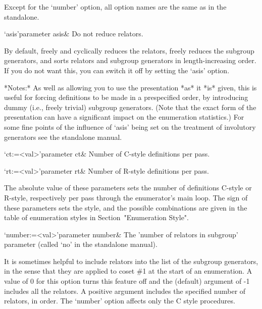 Except for  the `number' option, all  option names are the  same as in
the {\ACE} standalone.



\beginitems
\>`asis'{parameter asis}&
Do not reduce relators.
\enditems

By default, {\ACE} freely  and cyclically reduces the relators, freely
reduces  the  subgroup generators,  and  sorts  relators and  subgroup
generators in length-increasing  order.  If you do not  want this, you
can switch it off by setting the `asis' option.

*Notes:* As well as allowing you  to use the presentation *as* it *is*
given,  this  is  useful for  forcing  definitions  to  be made  in  a
prespecified  order,  by  introducing  dummy  (i.e.,  freely  trivial)
subgroup generators.   (Note that the  exact form of  the presentation
can  have a significant  impact on  the enumeration  statistics.)  For
some fine points of the influence of `asis' being set on the treatment
of involutory generators see the {\ACE} standalone manual.



\beginitems

\>`ct:=<val>'{parameter ct}&
Number of C-style definitions per pass.

\>`rt:=<val>'{parameter rt}&
Number of R-style definitions per pass.


The absolute value of these  parameters sets the number of definitions
C-style  or R-style,  respectively per  pass through  the enumerator's
main  loop.  The  sign of  these parameters  sets the  style,  and the
possible  combinations are given  in the  table of  enumeration styles
in Section~"Enumeration Style".


\>`number:=<val>'{parameter  number}&   The  'number  of   relators  in
subgroup' parameter (called `no' in the standalone manual).

It  is sometimes  helpful to  include relators  into the  list  of the
subgroup generators, in  the sense that they are  applied to coset \#1
at the  start of an enumeration.  A  value of 0 for  this option turns
this feature  off and  the (default) argument  of -1 includes  all the
relators.   A  positive  argument  includes the  specified  number  of
relators,  in order.   The `number'  option affects  only the  C style
procedures.


